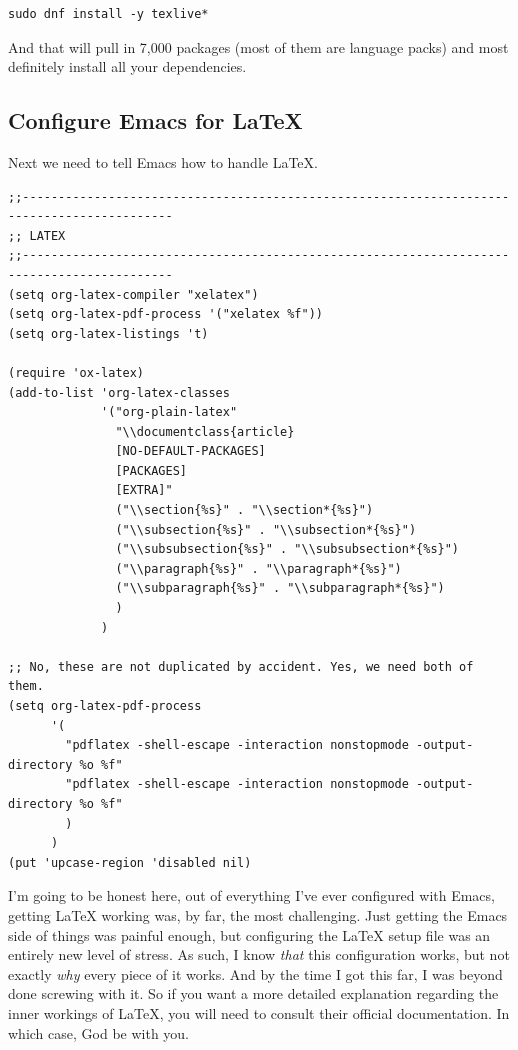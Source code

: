 \documentclass[11pt]{article}
\begin{document}
\begin{verbatim}
sudo dnf install -y texlive*
\end{verbatim}

And that will pull in 7,000 packages (most of them are language packs) and most definitely install all your dependencies.
\subsection*{Configure Emacs for \LaTeX{}}
\label{sec:orgce93803}
Next we need to tell Emacs how to handle \LaTeX{}.

\begin{verbatim}
;;-------------------------------------------------------------------------------------------
;; LATEX
;;-------------------------------------------------------------------------------------------
(setq org-latex-compiler "xelatex")
(setq org-latex-pdf-process '("xelatex %f"))
(setq org-latex-listings 't)

(require 'ox-latex)
(add-to-list 'org-latex-classes
             '("org-plain-latex"
               "\\documentclass{article}
               [NO-DEFAULT-PACKAGES]
               [PACKAGES]
               [EXTRA]"
               ("\\section{%s}" . "\\section*{%s}")
               ("\\subsection{%s}" . "\\subsection*{%s}")
               ("\\subsubsection{%s}" . "\\subsubsection*{%s}")
               ("\\paragraph{%s}" . "\\paragraph*{%s}")
               ("\\subparagraph{%s}" . "\\subparagraph*{%s}")
               )
             )

;; No, these are not duplicated by accident. Yes, we need both of them.
(setq org-latex-pdf-process
      '(
        "pdflatex -shell-escape -interaction nonstopmode -output-directory %o %f"
        "pdflatex -shell-escape -interaction nonstopmode -output-directory %o %f"
        )
      )
(put 'upcase-region 'disabled nil)
\end{verbatim}

I'm going to be honest here, out of everything I've ever configured with Emacs, getting \LaTeX{} working was, by far, the most challenging. Just getting the Emacs side of things was painful enough, but configuring the \LaTeX{} setup file was an entirely new level of stress. As such, I know \emph{that} this configuration works, but not exactly \emph{why} every piece of it works. And by the time I got this far, I was beyond done screwing with it. So if you want a more detailed explanation regarding the inner workings of \LaTeX{}, you will need to consult their official documentation. In which case, God be with you.
\end{document}

